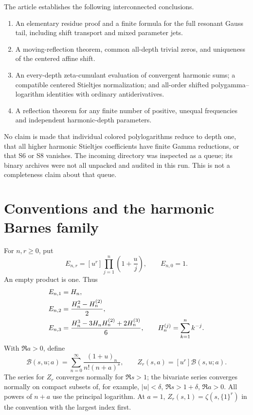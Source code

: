 \documentclass[11pt]{article}
\numberwithin{equation}{section}
\theoremstyle{definition}\newtheorem{definition}[theorem]{Definition}
\theoremstyle{remark}\newtheorem{remark}[theorem]{Remark}
\newcommand{\Bcal}{\mathcal B}
\begin{document}
The article establishes the following interconnected conclusions.
\begin{enumerate}[label=\arabic*.]
\item An elementary residue proof and a finite formula for the full
resonant Gauss tail, including shift transport and mixed parameter jets.
\item A moving-reflection theorem, common all-depth trivial zeros,
and uniqueness of the centered affine shift.
\item An every-depth zeta-cumulant evaluation of convergent harmonic sums;
a compatible centered Stieltjes normalization; and all-order shifted
polygamma--logarithm identities with ordinary antiderivatives.
\item A reflection theorem for any finite number of positive, unequal
frequencies and independent harmonic-depth parameters.
\end{enumerate}
No claim is made that individual colored polylogarithms reduce to depth
one, that all higher harmonic Stieltjes coefficients have finite Gamma
reductions, or that S6 or S8 vanishes. The incoming directory was inspected
as a queue; its binary archives were not all unpacked and audited in this
run. This is not a completeness claim about that queue.

\section{Conventions and the harmonic Barnes family}
\label{agrc:preliminaries}

For $n,r\geq0$, put
\begin{equation}\label{agrc:elementary}
 E_{n,r}=[u^r]\prod_{j=1}^{n}\left(1+\frac uj\right),
 \qquad E_{n,0}=1.
\end{equation}
An empty product is one. Thus
\begin{align}
 E_{n,1}&=H_n,\notag\\
 E_{n,2}&=\frac{H_n^2-H_n^{(2)}}2,\notag\\
 E_{n,3}&=\frac{H_n^3-3H_nH_n^{(2)}+2H_n^{(3)}}6,
 \qquad H_n^{(j)}=\sum_{k=1}^n k^{-j}.\label{agrc:elementary-examples}
\end{align}
With $\Re a>0$, define
\begin{equation}\label{agrc:BZ}
 \Bcal(s,u;a)=\sum_{n=0}^{\infty}
       \frac{(1+u)_n}{n!(n+a)^s},
 \qquad Z_r(s,a)=[u^r]\Bcal(s,u;a).
\end{equation}
The series for $Z_r$ converges normally for $\Re s>1$; the bivariate
series converges normally on compact subsets of, for example,
$|u|<\delta$, $\Re s>1+\delta$, $\Re a>0$.
All powers of $n+a$ use the principal logarithm. At $a=1$,
$Z_r(s,1)=\zeta(s,\{1\}^r)$ in the convention with the largest index first.
\end{document}

